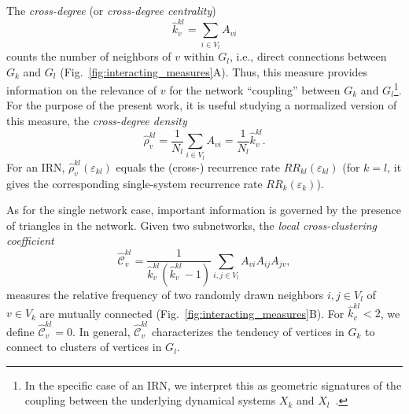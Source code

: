 \documentclass[graybox]{svmult}
\begin{document}
The \textit{cross-degree} (or \textit{cross-degree centrality})
\begin{equation}
\hat{k}_v^{kl} = \sum_{i \in V_l} A_{vi}
\label{eq:degree_cross}
\end{equation}
counts the number of neighbors of $v$ within $G_l$, i.e., direct connections between $G_k$ and $G_l$ (Fig.~\ref{fig:interacting_measures}A). Thus, this measure provides information on the relevance of $v$ for the network ``coupling'' between $G_k$ and $G_l$\footnote{In the specific case of an IRN, we interpret this as geometric signatures of the coupling between the underlying dynamical systems $X_k$ and $X_l$~\cite{Feldhoff2011,Feldhoff2012}.}. For the purpose of the present work, it is useful studying a normalized version of this measure, the \textit{cross-degree density}
\begin{equation}
\hat{\rho}_v^{kl} = \frac{1}{N_l} \sum_{i \in V_l} A_{vi} = \frac{1}{N_l} \hat{k}_v^{kl}.
\label{eq:locrho_cross}
\end{equation}
\noindent
For an IRN, $\hat{\rho}_v^{kl}(\varepsilon_{kl})$ equals the (cross-) recurrence rate $RR_{kl}(\varepsilon_{kl})$ (for $k=l$, it gives the corresponding single-system recurrence rate $RR_k(\varepsilon_k)$).

As for the single network case, important information is governed by the presence of triangles in the network. Given two subnetworks, the \textit{local cross-clustering coefficient}
\begin{equation}
\hat{\mathcal{C}}_v^{kl} = \frac{1}{\hat{k}_v^{kl}(\hat{k}_v^{kl} - 1)} \sum_{i,j \in V_l} A_{vi} A_{ij} A_{jv},
\label{eq:locclustering_cross}
\end{equation}
\noindent
measures the relative frequency of two randomly drawn neighbors $i,j\in V_l$ of $v\in V_k$ are mutually connected (Fig.~\ref{fig:interacting_measures}B). For $\hat{k}_v^{kl}<2$, we define $\hat{\mathcal{C}}_v^{kl}=0$. In general, $\hat{\mathcal{C}}_v^{kl}$ characterizes the tendency of vertices in $G_k$ to connect to clusters of vertices in $G_l$. 
\end{document}

